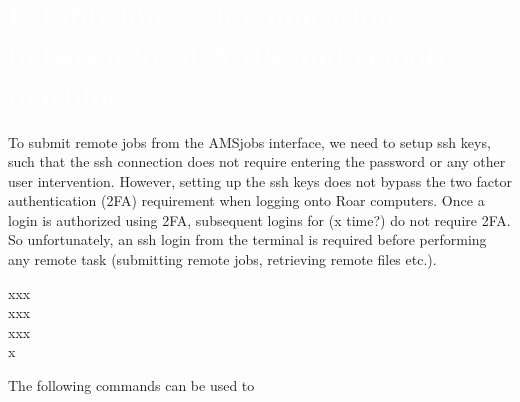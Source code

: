 \section{\textcolor{white}{Establishing ssh connection between local AMS and remote machine} \label{sec2}
}
To submit remote jobs from the AMSjobs interface, we need to setup ssh keys, such that the ssh connection does not require entering the password or any other user intervention. 
However, setting up the ssh keys does not bypass the two factor authentication (2FA) requirement when logging onto Roar computers. 
Once a login is authorized using 2FA, subsequent logins for (x time?) do not require 2FA. 
So unfortunately, an ssh login from the terminal is required before performing any remote task (submitting remote jobs, retrieving remote files etc.). \\

\begin{tcolorbox}[colback=pantone!10!white,colframe=pantone,title=\textit{For Windows local machines only, perform this step first.}]
    xxx\\
    xxx\\
    xxx\\
    x
\end{tcolorbox}
The following commands can be used to  